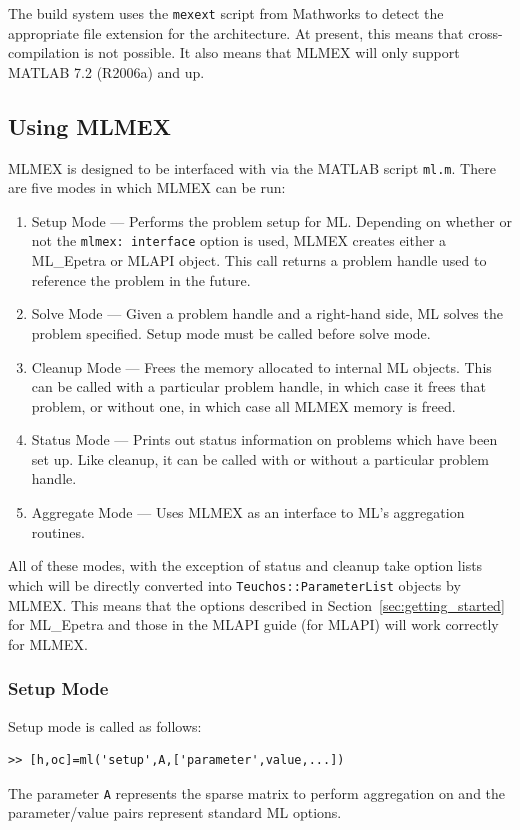 \documentclass{article}[11pt]
\begin{document}
The build system uses the \texttt{mexext} script from Mathworks to
detect the appropriate file extension for the architecture.  At
present, this means that cross-compilation is not possible.  It also
means that MLMEX will only support MATLAB 7.2 (R2006a) and up.


\subsection{Using MLMEX}\label{sec:mlmex:usage}
MLMEX is designed to be interfaced with via the MATLAB script
\texttt{ml.m}.  There are five modes in which MLMEX can be run:
\begin{enumerate}
\item Setup Mode --- Performs the problem setup for ML.
  Depending on whether or not the \texttt{mlmex: interface} option is
  used, MLMEX creates either a ML\_Epetra or MLAPI object.  This call
  returns a problem handle used to reference the problem in the future.
\item Solve Mode --- Given a problem handle and a right-hand side, ML
  solves the problem specified.  Setup mode must be called before
  solve mode.
\item Cleanup Mode --- Frees the memory allocated to internal ML
  objects.  This can be called with a particular problem handle, in
  which case it frees that problem, or without one, in which case all
  MLMEX memory is freed.
\item Status Mode --- Prints out status information on problems which
  have been set up.  Like cleanup, it can be called with or without a
  particular problem handle.
\item Aggregate Mode --- Uses MLMEX as an interface to ML's
  aggregation routines. 
\end{enumerate}
All of these modes, with the exception of status and cleanup take
option lists which will be directly converted into
\texttt{Teuchos::ParameterList} objects by MLMEX.  This means that 
the options described in Section~\ref{sec:getting_started} for
ML\_Epetra and those in the MLAPI guide (for MLAPI) will work
correctly for MLMEX. 

\subsubsection{Setup Mode}
Setup mode is called as follows:
\begin{verbatim}
>> [h,oc]=ml('setup',A,['parameter',value,...]) 
\end{verbatim}
The parameter \texttt{A} represents the sparse matrix to perform aggregation on
and the parameter/value pairs represent standard ML options.
\end{document}

